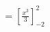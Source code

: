 \documentclass[preview]{standalone}
\begin{document}
\begin{align*}
&= \left[ \frac{x^3}{3} \right]_{-2}^{2}
\end{align*}
\end{document}
